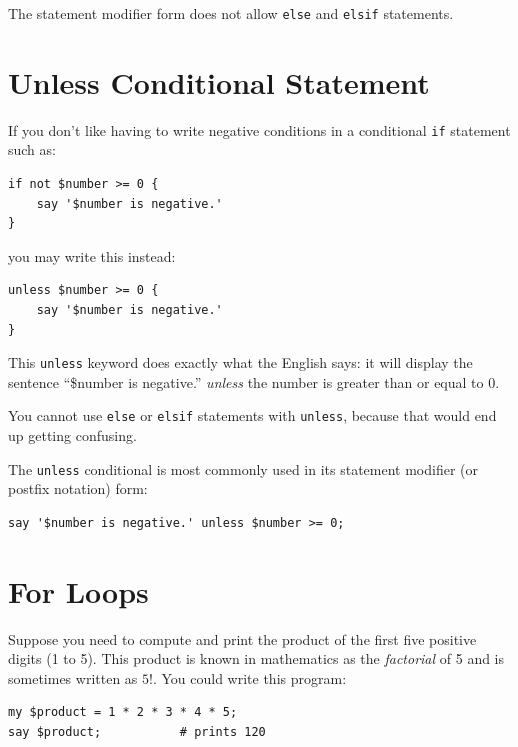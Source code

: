 The statement modifier form does not allow {\tt else} and
{\tt elsif} statements.

\section{Unless Conditional Statement}

If you don't like having to write negative conditions in a conditional
{\tt if} statement such as:
%
\begin{verbatim}
if not $number >= 0 {
    say '$number is negative.' 
}
\end{verbatim}
%

you may write this instead:
\begin{verbatim}
unless $number >= 0 {
    say '$number is negative.' 
}
\end{verbatim}
%
This \verb'unless' keyword does exactly what the English says: 
it will display the sentence ``\$number is negative.'' 
\emph{unless} the number is greater than or equal to 0.

You cannot use {\tt else} or {\tt elsif} statements with 
{\tt unless}, because that would end up getting confusing.

The {\tt unless} conditional is most commonly used in its statement modifier (or postfix notation) form:

 
 

\begin{verbatim}
say '$number is negative.' unless $number >= 0;
\end{verbatim}
%

\section{For Loops}
\label{for_loops}

Suppose you need to compute and print the product of the first 
five positive digits (1 to 5). This product is known in mathematics 
as the \emph{factorial} of 5 and is sometimes written as $5!$. 
You could write this program:

\begin{verbatim}
my $product = 1 * 2 * 3 * 4 * 5;
say $product;           # prints 120
\end{verbatim}
%


